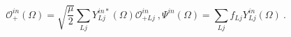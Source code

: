 \begin{equation}
\mathcal{O}^{in}_+(\Omega)=\sqrt{\frac{\mu}{2}}
\sum_{Lj} Y_{Lj}^{in*}(\Omega)\mathcal{O}_{+Lj}
^{in} \ , \Psi^{in}(\Omega)=
\sum_{Lj} f_{Lj}
Y_{Lj}^{in}(\Omega) \ .
\end{equation}

